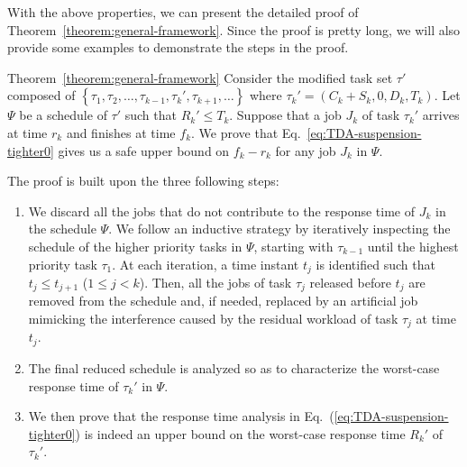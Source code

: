 With the above properties, we can present the detailed proof of
Theorem~\ref{theorem:general-framework}. Since the proof is pretty long, we 
will also provide some examples to demonstrate the steps in the proof.

\begin{appProof}{Theorem~\ref{theorem:general-framework}}
Consider the modified task set $\tau'$ composed of $\left\{\tau_1, \tau_2, \ldots, \tau_{k-1}, \tau_k', \tau_{k+1}, \ldots \right\}$ where $\tau_k' = (C_k + S_k, 0, D_k, T_k)$. Let $\Psi$ be a schedule of $\tau'$ such that $R_k' \leq T_k$.  
Suppose that a job $J_{k}$ of task $\tau_k'$ arrives at time $r_k$ and finishes at time $f_k$. We prove that Eq.~\eqref{eq:TDA-suspension-tighter0} gives us a safe upper bound on $f_k-r_k$ for any job $J_k$ in $\Psi$.


The proof is built upon the three following steps:
\begin{enumerate}
\item We discard all the jobs that do not contribute to the response time of $J_k$ in the schedule $\Psi$. We follow an inductive strategy by iteratively inspecting the schedule of the higher priority tasks in $\Psi$, starting with $\tau_{k-1}$ until the highest priority task $\tau_1$. At each iteration, a time instant $t_j$ is identified such that $t_j \leq t_{j+1}$ ($1 \leq j < k$). Then, all the jobs of task $\tau_j$ released before $t_j$ are removed from the schedule and, if needed, replaced by an artificial job mimicking the interference caused by the residual workload of task $\tau_j$ at time $t_j$. %
\item The final reduced schedule is analyzed so as to characterize the
  worst-case response time of $\tau_k'$ in $\Psi$. %
\item We then prove that the response time analysis in Eq.~(\ref{eq:TDA-suspension-tighter0}) is indeed an upper bound on the worst-case response time $R_k'$ of $\tau_k'$.
\end{enumerate}

  

\end{appProof}
